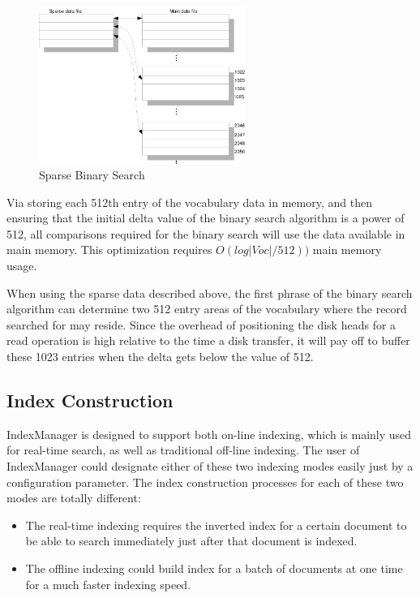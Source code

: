\begin{figure}[h!]
\centerline{\includegraphics[width=0.6\textwidth]{Figures/voc2.png}}
\caption{Sparse Binary Search}\label{fig:voc2}
\end{figure}

Via storing each 512th entry of the vocabulary data in memory, and then ensuring that the initial delta value of the binary search algorithm is a power of 512, all comparisons required for the binary search will use the data
available in main memory. This optimization requires $O(log|Voc|/512))$ main memory usage.

When using the sparse data described above, the first phrase of the binary search algorithm can determine two 512 entry areas of the vocabulary where the record searched for may reside. Since the overhead of positioning
the disk heads for a read operation is high relative to the time a disk transfer, it will pay off to buffer these 1023 entries when the delta gets below the value of 512. 

\subsection{Index Construction}\label{indexCon}
IndexManager is designed to support both on-line indexing, which is mainly used for real-time search, as well as traditional off-line indexing. The user of IndexManager could designate either of these two indexing modes easily 
just by a configuration parameter. The index construction processes for each of these two modes are totally different:
\begin{itemize}
 \item The real-time indexing requires the inverted index for a certain document to be able to search immediately just after that document is indexed. 
 \item The offline indexing could build index for a batch of documents at one time for a much faster indexing speed.
\end{itemize}

